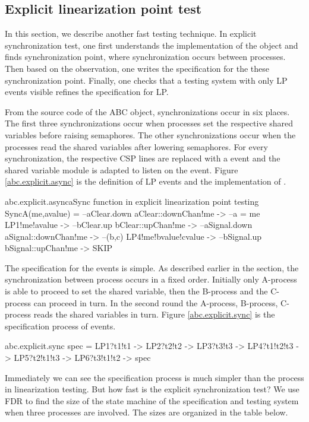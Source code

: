 \documentclass[a4paper, 12pt]{article}
\begin{document}
\subsection{Explicit linearization point test}
In this section, we describe another fast testing technique. In explicit synchronization test, one first understands the implementation of the object and finds synchronization point, where synchronization occurs between processes. Then based on the observation, one writes the specification for the these synchronization point. Finally, one checks that a testing system with only LP events visible refines the specification for LP.

From the source code of the ABC object, synchronizations occur in six places. The first three synchronizations occur when processes set the respective shared variables before raising semaphores. The other synchronizations occur when the processes read the shared variables after lowering semaphores. For every synchronization, the respective CSP lines are replaced with a  event and the shared variable module is adapted to listen on the  event. Figure \ref{abc.explicit.async} is the definition of LP events and the implementation of . 
\begin{cspfloat}{abc.explicit.async}{aSync function in explicit linearization point testing}
SyncA(me,avalue) =
  --aClear.down
  aClear::downChan!me ->
  --a = me
  LP1!me!avalue ->
  --bClear.up
  bClear::upChan!me ->
  --aSignal.down
  aSignal::downChan!me ->
  --(b,c)
  LP4!me!bvalue!cvalue ->
  --bSignal.up
  bSignal::upChan!me ->
  SKIP
\end{cspfloat}

The specification for the  events is simple. As described earlier in the section, the synchronization between process occurs in a fixed order. Initially only A-process is able to proceed to set the shared variable, then the B-process and the C-process can proceed in turn. In the second round the A-process, B-process, C-process reads the shared variables in turn. Figure \ref{abc.explicit.sync} is the specification process of  events. 

\begin{cspfloat}{abc.explicit.sync}{}
spec = 
  LP1?t1!t1 ->
  LP2?t2!t2 ->
  LP3?t3!t3 ->
  LP4?t1!t2!t3 ->
  LP5?t2!t1!t3 ->
  LP6?t3!t1!t2 ->
  spec
\end{cspfloat}

Immediately we can see the specification process is much simpler than the process in linearization testing. But how fast is the explicit synchronization test? We use FDR to find the size of the state machine of the specification and testing system when three processes are involved. The sizes are organized in the table below. 
\end{document}
